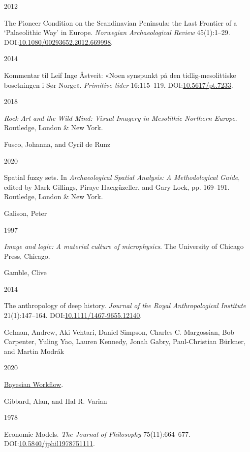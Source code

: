 \documentclass[
  12pt,
  a4paper,
  oneside]{book}
\newlength{\cslhangindent}
\newlength{\csllabelwidth}
\newlength{\cslentryspacingunit} %
\newenvironment{CSLReferences}[2] %
 {%
  \setlength{\parindent}{0pt}
  \ifodd #1
  \let\oldpar\par
  \def\par{\hangindent=\cslhangindent\oldpar}
  \fi
  \setlength{\parskip}{#2\cslentryspacingunit}
 }%
 {}
\newcommand{\CSLBlock}[1]{#1\hfill\break}
\newcommand{\CSLLeftMargin}[1]{\parbox[t]{\csllabelwidth}{#1}}
\newcommand{\CSLRightInline}[1]{\parbox[t]{\linewidth - \csllabelwidth}{#1}\break}
\begin{document}
\begin{CSLReferences}{0}{0}
\leavevmode{}%
\CSLLeftMargin{ 2012 }%
\CSLRightInline{{The Pioneer Condition on the Scandinavian Peninsula: the Last Frontier of a {`}Palaeolithic Way{'} in Europe}. \emph{Norwegian Archaeological Review} 45(1):1--29. DOI:\href{https://doi.org/10.1080/00293652.2012.669998}{10.1080/00293652.2012.669998}.}

\leavevmode{}%
\CSLLeftMargin{ 2014 }%
\CSLRightInline{{Kommentar til Leif Inge Åstveit: «Noen synspunkt på den tidlig-mesolittiske bosetningen i Sør-Norge»}. \emph{Primitive tider} 16:115--119. DOI:\href{https://doi.org/10.5617/pt.7233}{10.5617/pt.7233}.}

\leavevmode{}%
\CSLLeftMargin{ 2018 }%
\CSLRightInline{\emph{{Rock Art and the Wild Mind: Visual Imagery in Mesolithic Northern Europe}}. Routledge, London \& New York.}

\leavevmode{}%
\CSLBlock{Fusco, Johanna, and Cyril de Runz}
\CSLLeftMargin{ 2020}%
\CSLRightInline{Spatial fuzzy sets. In \emph{{Archaeological Spatial Analysis: A Methodological Guide}}, edited by Mark Gillings, Piraye Hacıgüzeller, and Gary Lock, pp. 169--191. Routledge, London \& New York.}

\leavevmode{}%
\CSLBlock{Galison, Peter}
\CSLLeftMargin{ 1997}%
\CSLRightInline{\emph{{Image and logic: A material culture of microphysics}}. The University of Chicago Press, Chicago.}

\leavevmode{}%
\CSLBlock{Gamble, Clive}
\CSLLeftMargin{ 2014}%
\CSLRightInline{{The anthropology of deep history}. \emph{Journal of the Royal Anthropological Institute} 21(1):147--164. DOI:\href{https://doi.org/10.1111/1467-9655.12140}{10.1111/1467-9655.12140}.}

\leavevmode{}%
\CSLBlock{Gelman, Andrew, Aki Vehtari, Daniel Simpson, Charles C. Margossian, Bob Carpenter, Yuling Yao, Lauren Kennedy, Jonah Gabry, Paul-Christian Bürkner, and Martin Modrák}
\CSLLeftMargin{ 2020}%
\CSLRightInline{\href{https://doi.org/10.48550/arXiv.2011.01808}{{Bayesian Workflow}}.}

\leavevmode{}%
\CSLBlock{Gibbard, Alan, and Hal R. Varian}
\CSLLeftMargin{ 1978}%
\CSLRightInline{{Economic Models}. \emph{The Journal of Philosophy} 75(11):664--677. DOI:\href{https://doi.org/10.5840/jphil1978751111}{10.5840/jphil1978751111}.}


\end{CSLReferences}
\end{document}
